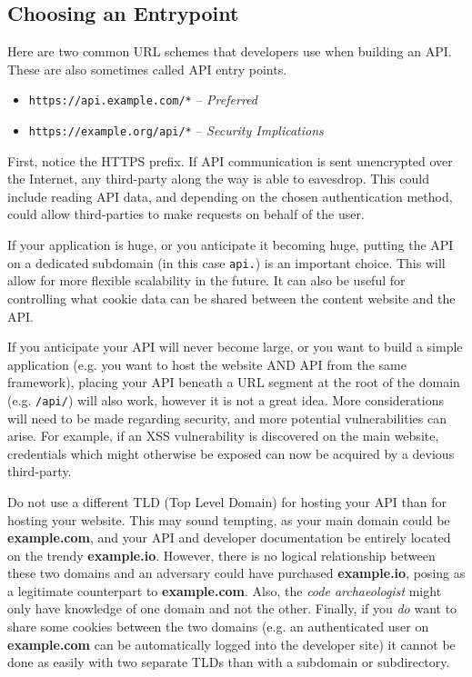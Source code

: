 \documentclass{book}
\begin{document}
\subsection{Choosing an Entrypoint}

Here are two common URL schemes that developers use when building an API. These are also sometimes called API entry points.

\begin{itemize}
\item \texttt{https://api.example.com/*} -- \emph{Preferred}
\item \texttt{https://example.org/api/*} -- \emph{Security Implications}
\end{itemize}

First, notice the HTTPS prefix. If API communication is sent unencrypted over the Internet, any third-party along the way is able to eavesdrop. This could include reading API data, and depending on the chosen authentication method, could allow third-parties to make requests on behalf of the user.

If your application is huge, or you anticipate it becoming huge, putting the API on a dedicated subdomain (in this case \texttt{api.}) is an important choice. This will allow for more flexible scalability in the future. It can also be useful for controlling what cookie data can be shared between the content website and the API.

If you anticipate your API will never become large, or you want to build a simple application (e.g. you want to host the website AND API from the same framework), placing your API beneath a URL segment at the root of the domain (e.g. \texttt{/api/}) will also work, however it is not a great idea. More considerations will need to be made regarding security, and more potential vulnerabilities can arise. For example, if an XSS vulnerability is discovered on the main website, credentials which might otherwise be exposed can now be acquired by a devious third-party.

Do not use a different TLD (Top Level Domain) for hosting your API than for hosting your website. This may sound tempting, as your main domain could be \textbf{example.com}, and your API and developer documentation be entirely located on the trendy \textbf{example.io}. However, there is no logical relationship between these two domains and an adversary could have purchased \textbf{example.io}, posing as a legitimate counterpart to \textbf{example.com}. Also, the \emph{code archaeologist} might only have knowledge of one domain and not the other. Finally, if you \emph{do} want to share some cookies between the two domains (e.g. an authenticated user on \textbf{example.com} can be automatically logged into the developer site) it cannot be done as easily with two separate TLDs than with a subdomain or subdirectory.
\end{document}

